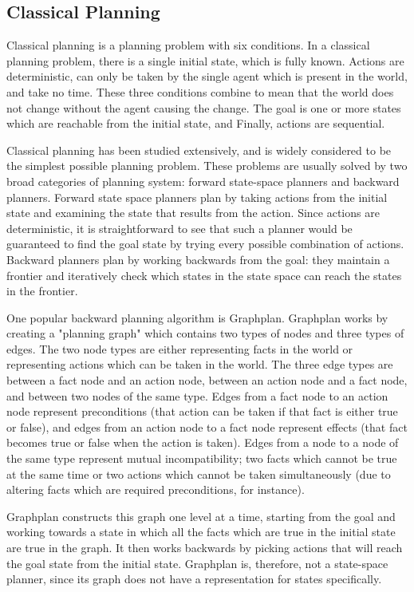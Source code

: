 \subsection{Classical Planning}
Classical planning is a planning problem with six conditions.  In a classical planning problem,
there is a single initial state, which is fully known.  Actions are deterministic, can only
be taken by the single agent which is present in the world, and take no time.  These three
conditions combine to mean that the world does not change without the agent causing the change.
The goal is one or more states which are reachable from the initial state, and
Finally, actions are sequential.

Classical planning has been studied extensively, and is widely considered to be the simplest possible
planning problem.  These problems are usually solved by two broad categories of
planning system: forward state-space planners and backward planners.  Forward state space planners
plan by taking actions from the initial state and examining the state that results from the action.  Since
actions are deterministic, it is straightforward to see that such a planner would be guaranteed to find
the goal state by trying every possible combination of actions.  Backward planners plan by working
backwards from the goal: they maintain a frontier and iteratively check which states in the state space
can reach the states in the frontier.

One popular backward planning algorithm is Graphplan\cite{graphplan}.  Graphplan works by creating
a "planning graph" which contains two types of nodes and three types of edges.  The two node types are
either representing facts in the world or representing actions which can be taken in the world.  The three edge
types are between a fact node and an action node, between an action node and a fact node, and between two
nodes of the same type.  Edges from a fact node to an action node represent preconditions (that action can be
taken if that fact is either true or false), and edges from an action node to a fact node represent effects (that
fact becomes true or false when the action is taken).  Edges from a node to a node of the same type represent
mutual incompatibility; two facts which cannot be true at the same time or two actions which cannot be taken
simultaneously (due to altering facts which are required preconditions, for instance).

Graphplan constructs this graph one level at a time, starting from the goal and working towards a state in which
all the facts which are true in the initial state are true in the graph.  It then works backwards by picking actions
that will reach the goal state from the initial state.  Graphplan is, therefore, not a state-space planner, since its
graph does not have a representation for states specifically.

